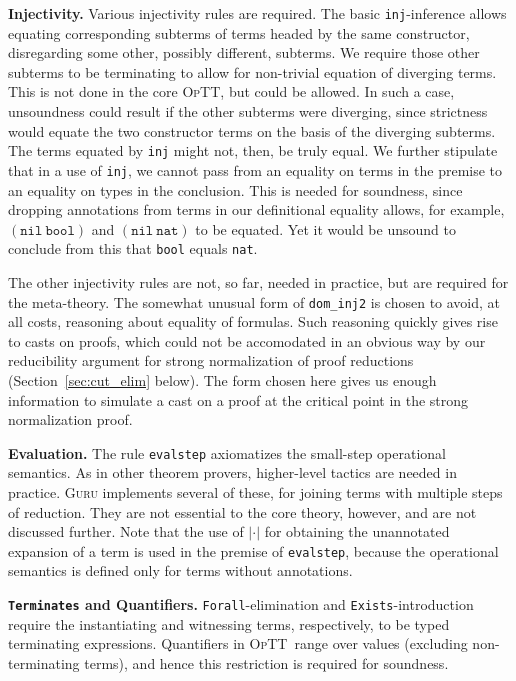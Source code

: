 \documentclass{fundam}
\newcommand{\optt}{\textsc{OpTT}}
\begin{document}
\textbf{Injectivity.} Various injectivity rules are required.  The
basic \texttt{inj}-inference allows equating corresponding subterms of
terms headed by the same constructor, disregarding some other,
possibly different, subterms.  We require those other subterms to be
terminating to allow for non-trivial equation of diverging terms.
This is not done in the core \optt, but could be allowed.  In such a
case, unsoundness could result if the other subterms were diverging,
since strictness would equate the two constructor terms on the basis
of the diverging subterms.  The terms equated by \texttt{inj} might
not, then, be truly equal.  We further stipulate that in a use of
\texttt{inj}, we cannot pass from an equality on terms in the premise
to an equality on types in the conclusion.  This is needed for
soundness, since dropping annotations from terms in our definitional
equality allows, for example, $(\texttt{nil}\ \texttt{bool})$ and
$(\texttt{nil}\ \texttt{nat})$ to be equated.  Yet it would be unsound
to conclude from this that \texttt{bool} equals \texttt{nat}.

The other injectivity rules are not, so far, needed in practice, but
are required for the meta-theory.  The somewhat unusual form of
\texttt{dom\_inj2} is chosen to avoid, at all costs, reasoning about
equality of formulas.  Such reasoning quickly gives rise to casts on
proofs, which could not be accomodated in an obvious way by our
reducibility argument for strong normalization of proof reductions
(Section~\ref{sec:cut_elim} below).  The form chosen here gives us
enough information to simulate a cast on a proof at the critical point
in the strong normalization proof.

\textbf{Evaluation.} The rule \texttt{evalstep} axiomatizes the
small-step operational semantics.  As in other theorem provers,
higher-level tactics are needed in practice.  \textsc{Guru} implements
several of these, for joining terms with multiple steps of reduction.
They are not essential to the core theory, however, and are not
discussed further.  Note that the use of $|\cdot|$ for obtaining the
unannotated expansion of a term is used in the premise of
\texttt{evalstep}, because the operational semantics is defined only
for terms without annotations.

\textbf{\texttt{Terminates} and Quantifiers.} \texttt{Forall}-elimination
and \texttt{Exists}-introduction require the instantiating and
witnessing terms, respectively, to be typed terminating expressions.
Quantifiers in \optt\ range over values (excluding non-terminating
terms), and hence this restriction is required for soundness.
\end{document}
